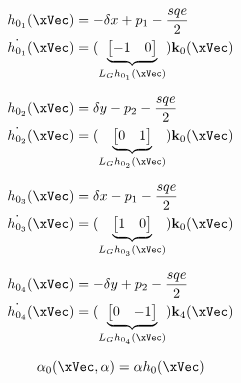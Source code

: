 \begin{subequations}
   \begin{align}
    &h_{0_1}(\xVec) = -\delta x + p_1 - \frac{sqe}{2}\label{eq:h0_1_orbital} \\
    &\dot{h_{0_1}}(\xVec) = (\underbrace{\begin{bmatrix} -1 & 0 \end{bmatrix}}_{L_Gh_{0_1}(\xVec)})\mathbf{k}_0(\xVec)  \label{eq:dot_h0_1_unicycle} 
\end{align}
\label{eq:CBF0_1_orbital}
\end{subequations}

\begin{subequations}
   \begin{align}
    &h_{0_2}(\xVec) = \delta y - p_2 - \frac{sqe}{2}\label{eq:h0_2_orbital} \\
    &\dot{h_{0_2}}(\xVec) = (\underbrace{\begin{bmatrix} 0 & 1 \end{bmatrix}}_{L_Gh_{0_2}(\xVec)})\mathbf{k}_0(\xVec)  \label{eq:dot_h0_2_unicycle} 
\end{align}
\label{eq:CBF0_2_orbital}
\end{subequations}

\begin{subequations}
   \begin{align}
    &h_{0_3}(\xVec) = \delta x - p_1 - \frac{sqe}{2}\label{eq:h0_3_orbital} \\
    &\dot{h_{0_3}}(\xVec) = (\underbrace{\begin{bmatrix} 1 & 0 \end{bmatrix}}_{L_Gh_{0_3}(\xVec)})\mathbf{k}_0(\xVec)  \label{eq:dot_h0_3_unicycle} 
\end{align}
\label{eq:CBF0_3_orbital}
\end{subequations}

\begin{subequations}
   \begin{align}
    &h_{0_4}(\xVec) = -\delta y + p_2 - \frac{sqe}{2}\label{eq:h0_4_orbital} \\
    &\dot{h_{0_4}}(\xVec) = (\underbrace{\begin{bmatrix} 0 & -1 \end{bmatrix}}_{L_Gh_{0_4}(\xVec)})\mathbf{k}_4(\xVec)  \label{eq:dot_h0_4_unicycle} 
\end{align}
\label{eq:CBF0_4_orbital}
\end{subequations}

\begin{equation}
  \alpha_0(\xVec, \alpha)  = \alpha h_0(\xVec) 
  \label{eq:CBF_alpha0_orbital}
\end{equation}



